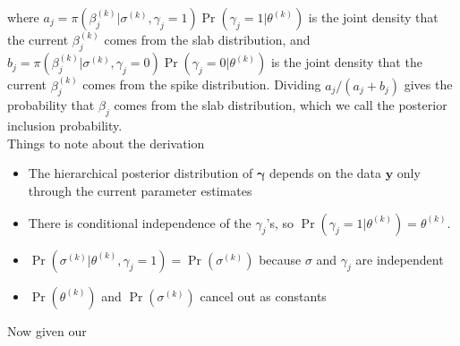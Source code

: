 \documentclass[11pt,a4paper]{article}
\begin{document}
\noindent where $a_j = \pi(\beta_j^{(k)}|\sigma^{(k)}, \gamma_j = 1)\Pr(\gamma_j = 1 | \theta^{(k)})$ is the joint density that the current $\beta_j^{(k)}$ comes from the slab distribution, and $b_j = \pi(\beta_j^{(k)}|\sigma^{(k)}, \gamma_j = 0)\Pr(\gamma_j = 0 | \theta^{(k)})$ is the joint density that the current $\beta_j^{(k)}$ comes from the spike distribution. Dividing $a_j /(a_j + b_j)$ gives the probability that $\beta_j$ comes from the slab distribution, which we call the posterior inclusion probability.\\
Things to note about the derivation
\begin{itemize}
    \item The hierarchical posterior distribution of $\boldsymbol{\gamma}$ depends on the data $\boldsymbol{y}$ only through the current parameter estimates
    \item There is conditional independence of the $\gamma_j$'s, so $\Pr(\gamma_j = 1 | \theta^{(k)}) = \theta^{(k)}$.
    \item $\Pr(\sigma^{(k)}|\theta^{(k)}, \gamma_j =1 ) = \Pr(\sigma^{(k)})$ because $\sigma$ and $\gamma_j$ are independent
    \item $\Pr(\theta^{(k)})$ and $\Pr(\sigma^{(k)})$ cancel out as constants
\end{itemize}

Now given our
\end{document}
